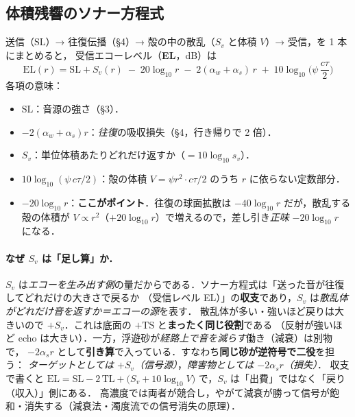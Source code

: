 \documentclass[11pt]{ltjsarticle}
\begin{document}
\subsection{体積残響のソナー方程式}
送信（$\mathrm{SL}$）→ 往復伝播（§4）→ 殻の中の散乱（$S_v$ と体積 $V$）→ 受信，を 1 本にまとめると，
受信エコーレベル（\textbf{EL}，dB）は
\begin{equation}
\boxed{\;\mathrm{EL}(r)=\mathrm{SL}+S_v(r)\;-\;20\log_{10} r\;-\;2(\alpha_w+\alpha_s)\,r\;+\;10\log_{10}\!\Big(\psi\,\frac{c\tau}{2}\Big)\;}
\label{eq:sonar}
\end{equation}
各項の意味：
\begin{itemize}[nosep]
  \item $\mathrm{SL}$：音源の強さ（§3）．
  \item $-2(\alpha_w+\alpha_s)r$：\emph{往復}の吸収損失（§4，行き帰りで 2 倍）．
  \item $S_v$：単位体積あたりどれだけ返すか（$=10\log_{10}s_v$）．
  \item $10\log_{10}(\psi\,c\tau/2)$：殻の体積 $V=\psi r^2\cdot c\tau/2$ のうち $r$ に依らない定数部分．
  \item $-20\log_{10}r$：\textbf{ここがポイント}．往復の球面拡散は $-40\log_{10}r$ だが，散乱する殻の体積が
        $V\propto r^2$（$+20\log_{10}r$）で増えるので，差し引き\emph{正味} $-20\log_{10}r$ になる．
\end{itemize}

\paragraph{なぜ $S_v$ は「足し算」か．}
$S_v$ は\emph{エコーを生み出す側}の量だからである．ソナー方程式は「送った音が往復してどれだけの大きさで戻るか
（受信レベル EL）」の\textbf{収支}であり，$S_v$ は\emph{散乱体がどれだけ音を返すか＝エコーの源}を表す．
散乱体が多い・強いほど戻りは大きいので $+S_v$．これは底面の $+\mathrm{TS}$ と\textbf{まったく同じ役割}である
（反射が強いほど echo は大きい）．一方，浮遊砂が\emph{経路上で音を減らす}働き（減衰）は別物で，
$-2\alpha_s r$ として\textbf{引き算}で入っている．すなわち\textbf{同じ砂が逆符号で二役}を担う：
\emph{ターゲットとしては $+S_v$（信号源）}，\emph{障害物としては $-2\alpha_s r$（損失）}．
収支で書くと $\mathrm{EL}=\mathrm{SL}-2\,\mathrm{TL}+\big(S_v+10\log_{10}V\big)$ で，$S_v$ は「出費」ではなく「戻り（収入）」側にある．
高濃度では両者が競合し，やがて減衰が勝って信号が飽和・消失する（減衰法・濁度流での信号消失の原理）．
\end{document}
